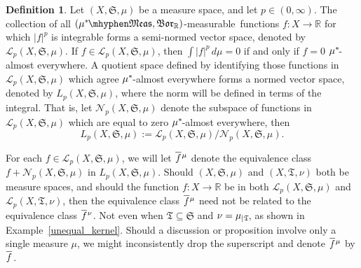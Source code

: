 \documentclass[
twoside=true,
paper=letter,
fontsize=9pt,
pagesize=auto,
leqno,
openany,
headsepline,
overfullrule,
]{scrbook}
\theoremstyle{plain}
\theoremstyle{plain}
\theoremstyle{definition}
\newtheorem{defn}[thm]{Definition}
\theoremstyle{bfnoteitalic}
\theoremstyle{bfnoteroman}
\newcommand{\sigalg}[1]{\mathfrak{#1}}
\newcommand{\cali}[1]{\mathscr{#1}}
\newcommand{\borel}{\mathfrak{Bor}}
\newcommand{\restrictedto}[1]{_{\lvert#1}\kern-1.5pt}
\newcommand{\abs}[1]{\left\vert#1\right\vert}
\newcommand{\R}{\mathbb{R}}
\newcommand{\semiring}{\sigalg{S}}
\newcommand{\semiringii}{\sigalg{T}}
\newcommand{\measurable}[1]{{#1}\mhyphen\mathfrak{Meas}}
\newcommand{\kernast}{\ast\kern-1pt}
\newcommand{\mbmeasurable}{$(\measurable{\measure^\kernast},\borel_\R)$\hyp{}measurable}
\newcommand{\measurespace}{X}
\newcommand{\measure}{\mu}
\newcommand{\measureii}{\nu}
\newcommand*\xbar[1]{%
   \hbox{%
     \vbox{%
       \hrule height 0.4pt %
       \kern0.4ex%
       \hbox{%
         \ensuremath{#1}%
       }%
     }%
   }%
}
\newcommand{\lebclass}[1]{\hspace{.5pt}\xbar{#1}\hspace{0.5pt}}
\newcommand{\ellclass}[2]{\lebclass{#1}^{#2}}
\begin{document}
\begin{defn}\label{Lp}
Let $(\measurespace, \semiring, \measure)$ be a measure space, and let $p \in (0, \infty)$.
The collection of all \mbmeasurable\ functions $f:\measurespace\to\R$ for which $\abs{f}^p$ is integrable forms a semi-normed vector space, denoted by 
$\cali{L}_p(\measurespace, \semiring, \measure)$.
\index{Lp@$L_p(\measurespace, \semiring, \measure)$}
If $f\in\cali{L}_p(\measurespace, \semiring, \measure)$, then $\int\abs{f}^p\,d\measure=0$ if and only if $f = 0$ $\measure^\kernast$-almost everywhere.
A quotient space defined by identifying those functions in $\cali{L}_p(\measurespace, \semiring, \measure)$ which agree $\measure^\kernast$-almost everywhere forms a normed vector space, denoted by $L_p(\measurespace, \semiring, \measure)$, where the norm will be defined in terms of the integral. That is, let 
$\cali{N}_p(\measurespace, \semiring, \measure)$ denote the subspace of functions in 
$\cali{L}_p(\measurespace, \semiring, \measure)$ which are equal to zero $\measure^\kernast$-almost everywhere, then
\[
L_p(\measurespace, \semiring, \measure) :=
\cali{L}_p(\measurespace, \semiring, \measure)/
\cali{N}_p(\measurespace, \semiring, \measure).
\]


For each $f\in\cali{L}_p(\measurespace, \semiring, \measure)$, we will let $\ellclass{f}{\measure}$ denote the equivalence class $f + \cali{N}_p(\measurespace, \semiring, \measure)$ in 
$L_p(\measurespace, \semiring, \measure)$.  Should $(\measurespace, \semiring, \measure)$ and $(\measurespace, \semiringii, \measureii)$
both be measure spaces, and should the function $f:\measurespace\to\R$ be in  both 
$\cali{L}_p(\measurespace, \semiring, \measure)$ and
$\cali{L}_p(\measurespace, \semiringii, \measureii)$,
then the equivalence class $\ellclass{f}{\measure}$ need not be related to the equivalence class  
$\ellclass{f}{\measureii}$.
Not even when $\semiringii\subseteq\semiring$ and $\measureii=\measure\restrictedto{\semiringii}$, as shown in Example~\ref{unequal_kernel}.
Should a discussion or proposition involve only a single measure $\mu$, we might inconsistently drop the superscript and denote
$\ellclass{f}{\mu}$ by $\lebclass{f}$.


\end{defn}
\end{document}
